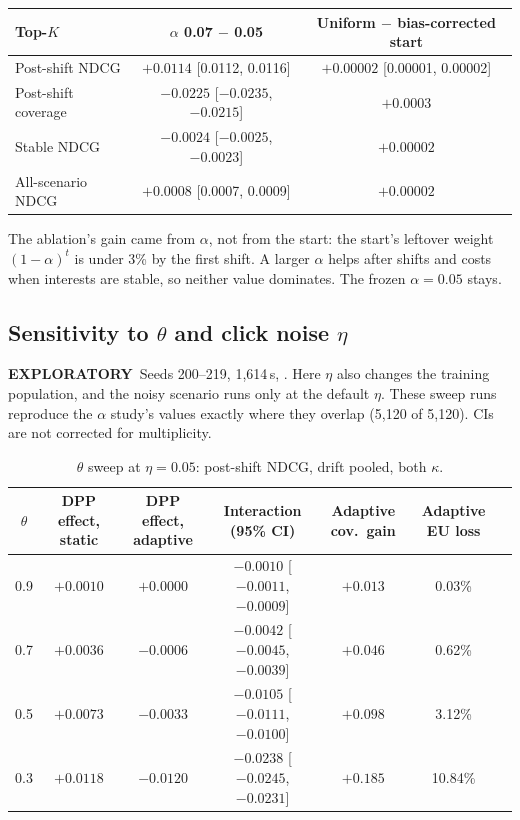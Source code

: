 \documentclass[11pt,a4paper]{article}
\newcommand{\statustag}[2]{\colorbox{#1}{\scriptsize\sffamily\bfseries #2}}
\newcommand{\exploratory}{\statustag{orange!20}{EXPLORATORY}}
\begin{document}
\begin{table}[h]\centering\small
\begin{tabular}{lcc}
\toprule
Top-$K$ & $\alpha$ 0.07 $-$ 0.05 & Uniform $-$ bias-corrected start \\
\midrule
Post-shift NDCG & $+0.0114$ [0.0112, 0.0116] & $+0.00002$ [0.00001, 0.00002] \\
Post-shift coverage & $-0.0225$ [$-0.0235$, $-0.0215$] & $+0.0003$ \\
Stable NDCG & $-0.0024$ [$-0.0025$, $-0.0023$] & $+0.00002$ \\
All-scenario NDCG & $+0.0008$ [0.0007, 0.0009] & $+0.00002$ \\
\bottomrule
\end{tabular}
\end{table}
The ablation's gain came from $\alpha$, not from the start: the start's leftover weight
$(1-\alpha)^t$ is under 3\% by the first shift. A larger $\alpha$ helps after shifts and costs
when interests are stable, so neither value dominates. The frozen $\alpha=0.05$ stays.

\subsection{Sensitivity to $\theta$ and click noise $\eta$}
\exploratory\ Seeds 200--219, 1{,}614\,s, . Here
$\eta$ also changes the training population, and the noisy scenario runs only at the default
$\eta$. These sweep runs reproduce the $\alpha$ study's values exactly where they overlap
(5{,}120 of 5{,}120). CIs are not corrected for multiplicity.

\begin{table}[h]\centering\small
\begin{tabular}{ccccccc}
\toprule
$\theta$ & DPP effect, static & DPP effect, adaptive & Interaction (95\% CI) & Adaptive cov.\ gain & Adaptive EU loss \\
\midrule
0.9 & $+0.0010$ & $+0.0000$ & $-0.0010$ [$-0.0011$, $-0.0009$] & $+0.013$ & 0.03\% \\
0.7 & $+0.0036$ & $-0.0006$ & $-0.0042$ [$-0.0045$, $-0.0039$] & $+0.046$ & 0.62\% \\
0.5 & $+0.0073$ & $-0.0033$ & $-0.0105$ [$-0.0111$, $-0.0100$] & $+0.098$ & 3.12\% \\
0.3 & $+0.0118$ & $-0.0120$ & $-0.0238$ [$-0.0245$, $-0.0231$] & $+0.185$ & 10.84\% \\
\bottomrule
\end{tabular}
\caption{$\theta$ sweep at $\eta=0.05$: post-shift NDCG, drift pooled, both $\kappa$.}
\end{table}
\end{document}
